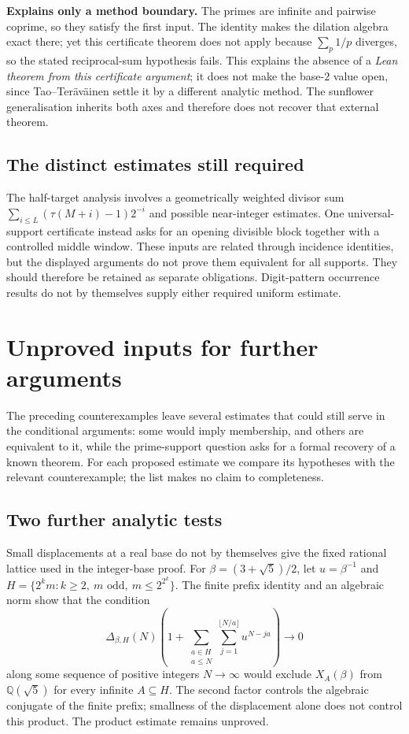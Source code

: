 \documentclass[11pt]{article}
\theoremstyle{plain}
\theoremstyle{definition}
\theoremstyle{remark}
\newcommand{\lean}[2]{\leanlink{#2}}
\newcommand{\Q}{\mathbb{Q}}
\begin{document}
\textbf{Explains only a method boundary.} The primes are infinite and pairwise coprime, so they satisfy the
first input.  The identity
\lean{compositeDilationDefect\_eq\_zero\_of\_prime\_support}{CompositeDilationDefect.lean:103} makes
the dilation algebra exact there; yet this certificate theorem does not
apply because $\sum_p1/p$ diverges, so the stated reciprocal-sum
hypothesis fails.  This explains
the absence of a \emph{Lean theorem from this certificate argument}; it does not make the
base-$2$ value open, since Tao--Ter\"av\"ainen settle it by a different
analytic method.  The sunflower generalisation inherits both axes and
therefore does not recover that external theorem.

\subsection{The distinct estimates still required}

The half-target analysis involves a geometrically weighted divisor sum
$\sum_{i\le L}(\tau(M+i)-1)2^{-i}$ and possible near-integer estimates.
One universal-support certificate instead asks for an opening divisible
block together with a controlled middle window.  These inputs are related
through incidence identities, but the displayed arguments do not prove
them equivalent for all supports.  They should therefore be retained as
separate obligations.  Digit-pattern occurrence results do not by
themselves supply either required uniform estimate.

\section{Unproved inputs for further arguments}
\label{sec:257-survivors}
The preceding counterexamples leave several estimates that could still
serve in the conditional arguments: some would imply membership, and
others are equivalent to it, while the prime-support question asks for
a formal recovery of a known theorem. For each proposed estimate we
compare its hypotheses with the relevant counterexample; the list makes
no claim to completeness.

\subsection*{Two further analytic tests}
Small displacements at a real base do not by themselves give the fixed
rational lattice used in the integer-base proof.  For
$\beta=(3+\sqrt5)/2$, let $u=\beta^{-1}$ and
$H=\{2^km:k\ge2,\ m\text{ odd},\ m\le2^{2^k}\}$.
The finite prefix identity and an algebraic norm show that the condition
\[
 \Delta_{\beta,H}(N)
 \left(1+\sum_{\substack{a\in H\\a\le N}}
                 \sum_{j=1}^{\lfloor N/a\rfloor}u^{N-ja}\right)
 \longrightarrow0
\]
along some sequence of positive integers $N\to\infty$ would exclude $X_A(\beta)$ from $\Q(\sqrt5)$ for every
infinite $A\subseteq H$.  The second factor controls the algebraic
conjugate of the finite prefix; smallness of the displacement alone does
not control this product.  The product estimate remains unproved.
\end{document}
